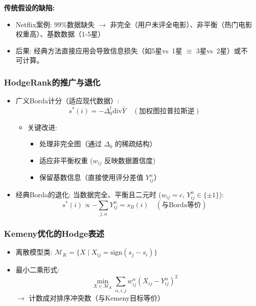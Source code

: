 \documentclass[a4paper]{article}
\begin{document}
\textbf{传统假设的缺陷:}

\begin{itemize}
    \item Netflix案例: 99\%数据缺失 $\rightarrow$ 非完全（用户未评全电影）、非平衡（热门电影权重高）、基数数据（1-5星）
    \item 后果: 经典方法直接应用会导致信息损失（如5星vs\ 1星 $\equiv$ 3星vs\ 2星）或不可计算。
\end{itemize}

\subsubsection{HodgeRank的推广与退化}

\begin{itemize}
    \item 广义Borda计分（适应现代数据）:
    $$
    s^*(i) = -\Delta_0^\dagger \text{div} \bar{Y} \quad (\text{加权图拉普拉斯逆})
    $$
    \begin{itemize}
        \item 关键改进:
        \begin{itemize}
            \item 处理非完全图（通过 $\Delta_0$ 的稀疏结构）
            \item 适应非平衡权重 ($w_{ij}$ 反映数据置信度)
            \item 保留基数信息（直接使用评分差值 $Y_{ij}^\alpha$）
        \end{itemize}
    \end{itemize}
    
    \item 经典Borda的退化:
    当数据完全、平衡且二元时 ($w_{ij} = c$, $Y_{ij}^\alpha \in \{\pm1\}$):
    $$
    s^*(i) \propto -\sum_{j,\alpha} Y_{ij}^\alpha = s_B(i) \quad (\text{与Borda等价})
    $$
\end{itemize}

\subsubsection{Kemeny优化的Hodge表述}

\begin{itemize}
    \item 离散模型类: $\mathcal{M}_K = \{X \mid X_{ij} = \text{sign}(s_j - s_i)\}$
    
    \item 最小二乘形式:
    $$
    \min_{X \in \mathcal{M}_K} \sum_{\alpha,i,j} w_{ij}^\alpha (X_{ij} - Y_{ij}^\alpha)^2
    $$
    $\rightarrow$ 计数成对排序冲突数（与Kemeny目标等价）
\end{itemize}
\end{document}
